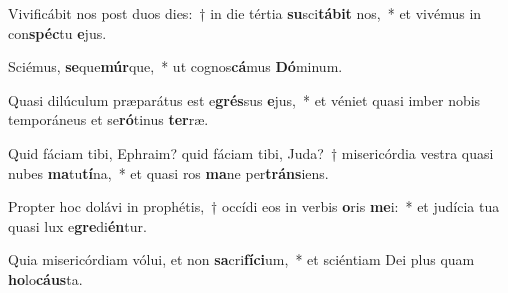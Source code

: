 \item Vivificábit nos post duos dies:~† in die tértia \textbf{su}sci\textbf{tá}\textbf{bit} nos,~* et vivémus in con\textbf{spéc}tu \textbf{e}jus.
\item Sciémus, \textbf{se}que\textbf{múr}que,~* ut cognos\textbf{cá}mus \textbf{Dó}minum.
\item Quasi dilúculum præparátus est e\textbf{grés}sus \textbf{e}jus,~* et véniet quasi imber nobis temporáneus et se\textbf{ró}tinus \textbf{ter}ræ.
\item Quid fáciam tibi, Ephraim? quid fáciam tibi, Juda?~† misericórdia vestra quasi nubes \textbf{ma}tu\textbf{tí}na,~* et quasi ros \textbf{ma}ne per\textbf{tráns}iens.
\item Propter hoc dolávi in prophétis,~† occídi eos in verbis \textbf{o}ris \textbf{me}i:~* et judícia tua quasi lux e\textbf{gre}di\textbf{én}tur.
\item Quia misericórdiam vólui, et non \textbf{sa}cri\textbf{fí}\textbf{ci}um,~* et sciéntiam Dei plus quam \textbf{ho}lo\textbf{cáus}ta.
